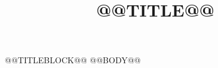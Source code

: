 \documentclass[10pt,a4paper,fontset=none]{ctexart}
\title{@@TITLE@@}
\author{}
\date{}
\theoremstyle{definition}
\theoremstyle{definition}
\begin{document}
\pagestyle{plain}
@@TITLEBLOCK@@
\normalsize
\setlength{\baselineskip}{16.73bp}
\setlength{\parindent}{19.925bp}
\setlength{\parskip}{9.55bp}
@@BODY@@
\end{document}

